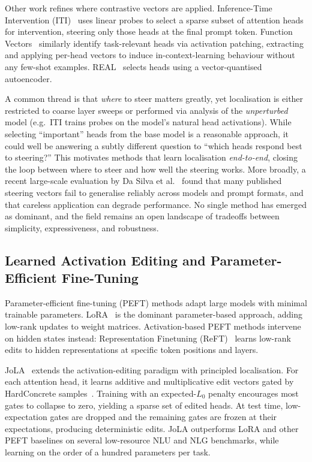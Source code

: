 Other work refines where contrastive vectors are applied.
Inference-Time Intervention (ITI)~\cite{li2024iti} uses linear probes to select a sparse subset of attention heads for intervention, steering only those heads at the final prompt token.
Function Vectors~\cite{todd2024functionvectors} similarly identify task-relevant heads via activation patching, extracting and applying per-head vectors to induce in-context-learning behaviour without any few-shot examples.
REAL~\cite{zhan2026real} selects heads using a vector-quantised autoencoder.

A common thread is that \emph{where} to steer matters greatly, yet localisation is either restricted to coarse layer sweeps or performed via analysis of the \emph{unperturbed} model (e.g.\ ITI trains probes on the model's natural head activations). While selecting ``important'' heads from the base model is a reasonable approach, it could well be answering a subtly different question to ``which heads respond best to steering?''
This motivates methods that learn localisation \emph{end-to-end}, closing the loop between where to steer and how well the steering works.
More broadly, a recent large-scale evaluation by Da Silva et al.~\cite{dasilva2025steering} found that many published steering vectors fail to generalise reliably across models and prompt formats, and that careless application can degrade performance. No single method has emerged as dominant, and the field remains an open landscape of tradeoffs between simplicity, expressiveness, and robustness.

\subsection{Learned Activation Editing and Parameter-Efficient Fine-Tuning}

Parameter-efficient fine-tuning (PEFT) methods adapt large models with minimal trainable parameters.
LoRA~\cite{hu2022lora} is the dominant parameter-based approach, adding low-rank updates to weight matrices.
Activation-based PEFT methods intervene on hidden states instead: Representation Finetuning (ReFT)~\cite{wu2024reft} learns low-rank edits to hidden representations at specific token positions and layers.

JoLA~\cite{lai2025jola} extends the activation-editing paradigm with principled localisation.
For each attention head, it learns additive and multiplicative edit vectors gated by HardConcrete samples~\cite{louizos2018hardconcrete}.
Training with an expected-$L_0$ penalty encourages most gates to collapse to zero, yielding a sparse set of edited heads.
At test time, low-expectation gates are dropped and the remaining gates are frozen at their expectations, producing deterministic edits.
JoLA outperforms LoRA and other PEFT baselines on several low-resource NLU and NLG benchmarks, while learning on the order of a hundred parameters per task.

